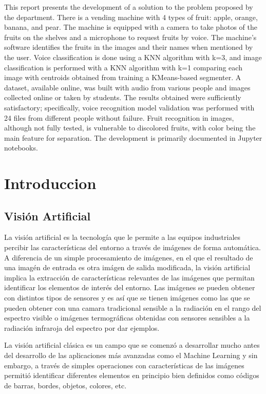 \documentclass[a4paper, 12pt]{article}
\begin{document}
This report presents the development of a solution to the problem proposed by the department. There is a vending machine with 4 types of fruit: apple, orange, banana, and pear. The machine is equipped with a camera to take photos of the fruits on the shelves and a microphone to request fruits by voice. The machine's software identifies the fruits in the images and their names when mentioned by the user. Voice classification is done using a KNN algorithm with k=3, and image classification is performed with a KNN algorithm with k=1 comparing each image with centroids obtained from training a KMeans-based segmenter. A dataset, available online, was built with audio from various people and images collected online or taken by students. The results obtained were sufficiently satisfactory; specifically, voice recognition model validation was performed with 24 files from different people without failure. Fruit recognition in images, although not fully tested, is vulnerable to discolored fruits, with color being the main feature for separation. The development is primarily documented in Jupyter notebooks.

\section{Introduccion}
\subsection{Visión Artificial}
La visión artificial es la tecnología que le permite a las equipos industriales percibir las características del entorno a través de imágenes de forma automática. A diferencia de un simple procesamiento de imágenes, en el que el resultado de una imagén de entrada es otra imágen de salida modificada, la visión artificial implica la extracción de características relevantes de las imágenes que permitan identificar los elementos de interés del entorno. Las imágenes se pueden obtener con distintos tipos de sensores y es así que se tienen imágenes como las que se pueden obtener con una camara tradicional sensible a la radiación en el rango del espectro visible o imágenes termográficas obtenidas con sensores sensibles a la radiación infraroja del espectro por dar ejemplos.

La visión artificial clásica es un campo que se comenzó a desarrollar mucho antes del desarrollo de las aplicaciones más avanzadas como el Machine Learning y sin embargo, a través de simples operaciones con características de las imágenes permitió identificar diferentes elementos en principio bien definidos como códigos de barras, bordes, objetos, colores, etc.
\end{document}
